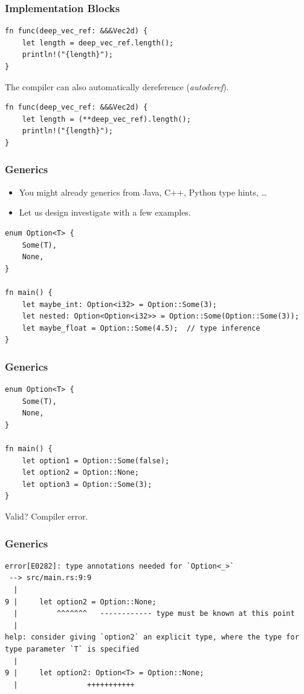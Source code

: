 \begin{frame}[fragile]
    \frametitle{Implementation Blocks}
    \begin{verbatim}
fn func(deep_vec_ref: &&&Vec2d) {
    let length = deep_vec_ref.length();
    println!("{length}");
}
    \end{verbatim}
    \vfill
    The compiler can also automatically dereference (\textit{autoderef}).
    \pause
    \vfill
    \begin{verbatim}
fn func(deep_vec_ref: &&&Vec2d) {
    let length = (**deep_vec_ref).length();
    println!("{length}");
}
    \end{verbatim}
\end{frame}

\begin{frame}[fragile]
    \frametitle{Generics}
    \begin{itemize}
        \item You might already generics from Java, C++, Python type hints, \ldots
        \item Let us design investigate with a few examples.
    \end{itemize}
    \pause
    \vfill
    \begin{verbatim}
enum Option<T> {
    Some(T),
    None,
}

fn main() {
    let maybe_int: Option<i32> = Option::Some(3);
    let nested: Option<Option<i32>> = Option::Some(Option::Some(3));
    let maybe_float = Option::Some(4.5);  // type inference
}
    \end{verbatim}
\end{frame}

\begin{frame}[fragile]
    \frametitle{Generics}
    \begin{verbatim}
enum Option<T> {
    Some(T),
    None,
}

fn main() {
    let option1 = Option::Some(false);
    let option2 = Option::None;
    let option3 = Option::Some(3);
}
    \end{verbatim}
    \vfill
    Valid?
    \pause
    \vfill
    Compiler error.
\end{frame}

\begin{frame}[fragile]
    \frametitle{Generics}
    \begin{verbatim}
error[E0282]: type annotations needed for `Option<_>`
 --> src/main.rs:9:9
  |
9 |     let option2 = Option::None;
  |         ^^^^^^^   ------------ type must be known at this point
  |
help: consider giving `option2` an explicit type, where the type for
type parameter `T` is specified
  |
9 |     let option2: Option<T> = Option::None;
  |                +++++++++++
    \end{verbatim}
\end{frame}

